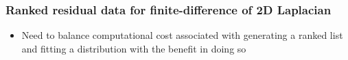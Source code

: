 \documentclass{beamer}
\begin{document}
\begin{frame}
	\frametitle{Ranked residual data for finite-difference of 2D Laplacian}
	\begin{figure}[H]
		\centering
	\end{figure}
	\begin{itemize}
		\item Need to balance computational cost associated with generating a ranked list and fitting a distribution with the benefit in doing so
	\end{itemize}
\end{frame}
\end{document}
